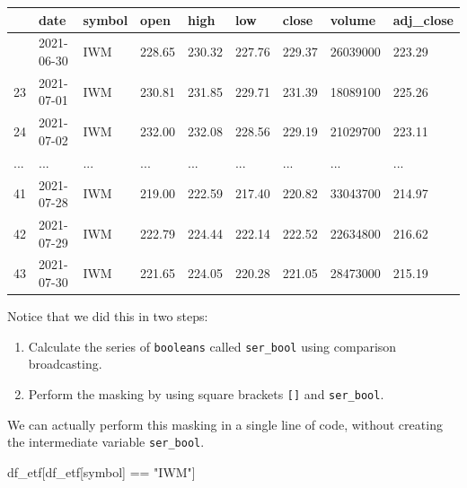 \documentclass[
  letterpaper,
  DIV=11,
  numbers=noendperiod]{scrreprt}
\newenvironment{Shaded}{\begin{snugshade}}{\end{snugshade}}
\newcommand{\NormalTok}[1]{\textcolor[rgb]{0.00,0.23,0.31}{#1}}
\newcommand{\OperatorTok}[1]{\textcolor[rgb]{0.37,0.37,0.37}{#1}}
\newcommand{\StringTok}[1]{\textcolor[rgb]{0.13,0.47,0.30}{#1}}
\begin{document}
\begin{longtable}[]{@{}lllllllll@{}}
\toprule\noalign{}
& date & symbol & open & high & low & close & volume & adj\_close \\
\midrule\noalign{}
\endhead
\bottomrule\noalign{}
\endlastfoot
22 & 2021-06-30 & IWM & 228.65 & 230.32 & 227.76 & 229.37 & 26039000 &
223.29 \\
23 & 2021-07-01 & IWM & 230.81 & 231.85 & 229.71 & 231.39 & 18089100 &
225.26 \\
24 & 2021-07-02 & IWM & 232.00 & 232.08 & 228.56 & 229.19 & 21029700 &
223.11 \\
... & ... & ... & ... & ... & ... & ... & ... & ... \\
41 & 2021-07-28 & IWM & 219.00 & 222.59 & 217.40 & 220.82 & 33043700 &
214.97 \\
42 & 2021-07-29 & IWM & 222.79 & 224.44 & 222.14 & 222.52 & 22634800 &
216.62 \\
43 & 2021-07-30 & IWM & 221.65 & 224.05 & 220.28 & 221.05 & 28473000 &
215.19 \\
\end{longtable}

Notice that we did this in two steps:

\begin{enumerate}
\def\labelenumi{\arabic{enumi}.}
\item
  Calculate the series of \texttt{booleans} called \texttt{ser\_bool}
  using comparison broadcasting.
\item
  Perform the masking by using square brackets \texttt{{[}{]}} and
  \texttt{ser\_bool}.
\end{enumerate}

We can actually perform this masking in a single line of code, without
creating the intermediate variable \texttt{ser\_bool}.

\begin{Shaded}
\begin{Highlighting}[]
\NormalTok{df\_etf[df\_etf[}\StringTok{\textquotesingle{}symbol\textquotesingle{}}\NormalTok{] }\OperatorTok{==} \StringTok{"IWM"}\NormalTok{]}
\end{Highlighting}
\end{Shaded}
\end{document}
